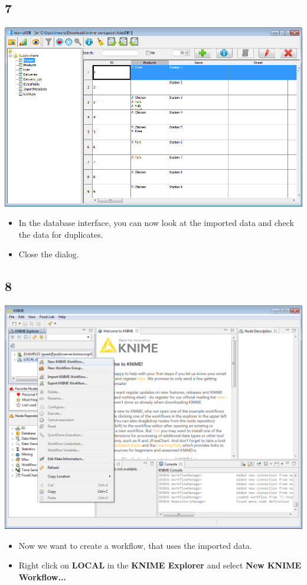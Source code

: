 \documentclass{beamer}
\begin{document}
\subsection{7}
\begin{frame}
	\begin{center}
  		\includegraphics[height=0.6\textheight]{7.png}
	\end{center}
	\begin{itemize}
		\item In the database interface, you can now look at the imported data and check the data for duplicates.
		\item Close the dialog.
	\end{itemize}
\end{frame}

\subsection{8}
\begin{frame}
	\begin{center}
  		\includegraphics[height=0.6\textheight]{8.png}
	\end{center}
	\begin{itemize}
		\item Now we want to create a workflow, that uses the imported data.
		\item Right click on \textbf{LOCAL} in the \textbf{KNIME Explorer} and select \textbf{New KNIME Workflow...}
	\end{itemize}
\end{frame}
\end{document}
